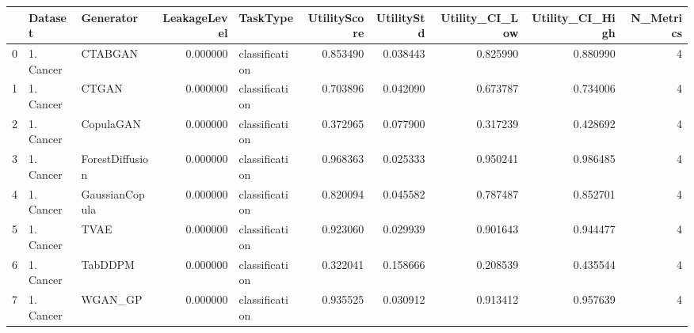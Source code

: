\begin{tabular}{lllrlrrrrr}
\toprule
 & Dataset & Generator & LeakageLevel & TaskType & UtilityScore & UtilityStd & Utility_CI_Low & Utility_CI_High & N_Metrics \\
\midrule
0 & 1. Cancer & CTABGAN & 0.000000 & classification & 0.853490 & 0.038443 & 0.825990 & 0.880990 & 4 \\
1 & 1. Cancer & CTGAN & 0.000000 & classification & 0.703896 & 0.042090 & 0.673787 & 0.734006 & 4 \\
2 & 1. Cancer & CopulaGAN & 0.000000 & classification & 0.372965 & 0.077900 & 0.317239 & 0.428692 & 4 \\
3 & 1. Cancer & ForestDiffusion & 0.000000 & classification & 0.968363 & 0.025333 & 0.950241 & 0.986485 & 4 \\
4 & 1. Cancer & GaussianCopula & 0.000000 & classification & 0.820094 & 0.045582 & 0.787487 & 0.852701 & 4 \\
5 & 1. Cancer & TVAE & 0.000000 & classification & 0.923060 & 0.029939 & 0.901643 & 0.944477 & 4 \\
6 & 1. Cancer & TabDDPM & 0.000000 & classification & 0.322041 & 0.158666 & 0.208539 & 0.435544 & 4 \\
7 & 1. Cancer & WGAN_GP & 0.000000 & classification & 0.935525 & 0.030912 & 0.913412 & 0.957639 & 4 \\
\bottomrule
\end{tabular}
